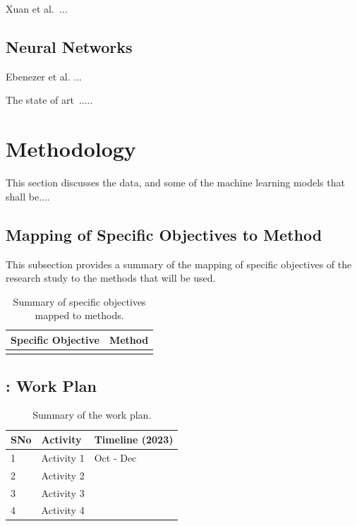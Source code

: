 \documentclass[letterpaper,12pt]{article}
\begin{document}
Xuan et al.~\cite{xuan2018random}...

\subsection{Neural Networks}
Ebenezer et al. \cite{esenogho2022neural}...

The state of art~\cite{ucc}.....

\section{Methodology} \label{methodology}
This section discusses the data, and some of the machine learning models that shall be....
\subsection{Mapping of Specific Objectives to Method}
This subsection provides a summary of the mapping of specific objectives of the research study to the methods that will be used.
\begin{table}[hbt!]
    \centering
    \begin{tabular}{|m{6cm}|m{9cm}|}
    \hline
        \textbf{Specific Objective} & \textbf{Method}\\
        \hline
   & \\
\hline
    \end{tabular}
    \caption{Summary of specific objectives mapped to methods.}
    \label{tab:my_label}
\end{table}
\FloatBarrier
\pagebreak
\newpage
 

\newpage
\begin{appendices}
\section{: Work Plan}
\begin{table}[hbt!]
    \centering
    \begin{tabular}{|m{1cm}|m{10cm}|m{3cm}|}
        \hline
         SNo & Activity& Timeline (2023) \\
         \hline
        1 & Activity 1 & Oct - Dec \\
         \hline
            2 & Activity 2 & \\
         \hline
            3 & Activity 3 &  \\
         \hline
         4 & Activity 4  & \\
         \hline
         
         
    \end{tabular}
    \caption{Summary of the work plan.}
    \label{tab:my_label}
\end{table}
\FloatBarrier
\end{appendices}
\end{document}
